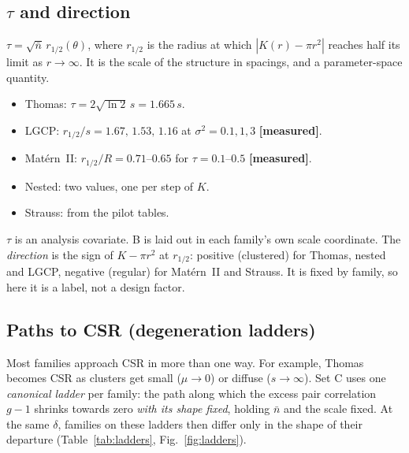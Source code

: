 \documentclass[10pt,a4paper]{article}
\newcommand{\measured}{\textcolor{green!45!black}{\textbf{[measured]}}}
\newcommand{\nbar}{\bar n}
\begin{document}
\subsection{$\tau$ and direction}
$\tau=\sqrt{\nbar}\,r_{1/2}(\theta)$, where $r_{1/2}$ is the radius at which $|K(r)-\pi r^2|$ reaches half its limit as $r\to\infty$. It is the scale of the structure in spacings, and a parameter-space quantity.
\begin{itemize}
  \item Thomas: $\tau=2\sqrt{\ln2}\,s=1.665\,s$.
  \item LGCP: $r_{1/2}/s=1.67,\,1.53,\,1.16$ at $\sigma^2=0.1,1,3$ \measured.
  \item Mat\'ern~II: $r_{1/2}/R=0.71$--$0.65$ for $\tau=0.1$--$0.5$ \measured.
  \item Nested: two values, one per step of $K$.
  \item Strauss: from the pilot tables.
\end{itemize}
$\tau$ is an analysis covariate. B is laid out in each family's own scale coordinate. The \emph{direction} is the sign of $K-\pi r^2$ at $r_{1/2}$: positive (clustered) for Thomas, nested and LGCP, negative (regular) for Mat\'ern~II and Strauss. It is fixed by family, so here it is a label, not a design factor.

\subsection{Paths to CSR (degeneration ladders)}\label{sec:ladders}
Most families approach CSR in more than one way. For example, Thomas becomes CSR as clusters get small ($\mu\to0$) or diffuse ($s\to\infty$). Set C uses one \emph{canonical ladder} per family: the path along which the excess pair correlation $g-1$ shrinks towards zero \emph{with its shape fixed}, holding $\nbar$ and the scale fixed. At the same $\delta$, families on these ladders then differ only in the shape of their departure (Table~\ref{tab:ladders}, Fig.~\ref{fig:ladders}).
\end{document}
